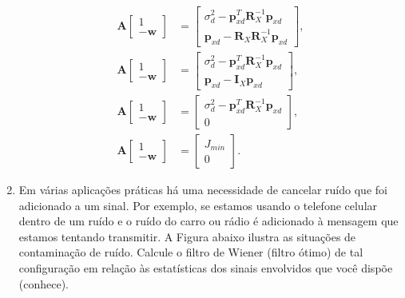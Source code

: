 \documentclass[a4paper,10pt]{article}
\begin{document}
\begin{enumerate}
				\begin{align}
					\mathbf{A} \left[ \begin{matrix} 1 \\ -\mathbf{w} \end{matrix} \right] &=   \left[ \begin{matrix} \sigma^{2}_{d} - \mathbf{p}_{xd}^{T}\mathbf{R}^{-1}_{X} \mathbf{p}_{xd} \\
						\mathbf{p}_{xd} - \mathbf{R}_{X}\mathbf{R}^{-1}_{X} \mathbf{p}_{xd} \end{matrix} \right], \\
					\mathbf{A} \left[ \begin{matrix} 1 \\ -\mathbf{w} \end{matrix} \right] &=   \left[ \begin{matrix} \sigma^{2}_{d} - \mathbf{p}_{xd}^{T}\mathbf{R}^{-1}_{X} \mathbf{p}_{xd} \\
						\mathbf{p}_{xd} - \mathbf{I}_{X}\mathbf{p}_{xd} \end{matrix} \right], \\
					\mathbf{A} \left[ \begin{matrix} 1 \\ -\mathbf{w} \end{matrix} \right] &=   \left[ \begin{matrix} \sigma^{2}_{d} - \mathbf{p}_{xd}^{T
						}\mathbf{R}^{-1}_{X} \mathbf{p}_{xd} \\ 0 \end{matrix} \right], \\
					\mathbf{A} \left[ \begin{matrix} 1 \\ -\mathbf{w} \end{matrix} \right] &=   \left[ \begin{matrix} J_{min} \\ 0 \end{matrix} \right].
				\end{align}
			
			\item Em várias aplicações práticas há uma necessidade de cancelar ruído que foi adicionado a um sinal. Por exemplo, se estamos usando o telefone celular dentro de um ruído e o ruído do carro ou rádio é adicionado à mensagem que estamos tentando transmitir. A Figura abaixo ilustra as situações de contaminação de ruído. Calcule o filtro de Wiener (filtro ótimo) de tal configuração em relação às estatísticas dos sinais envolvidos que você dispõe (conhece).
			

\end{enumerate}
\end{document}
